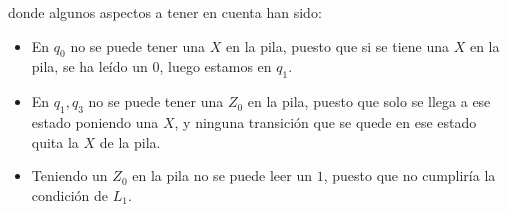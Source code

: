 \begin{ejercicio}
\begin{description}
\begin{comment}
            &\delta(q_0,2,Z_0) = \{(q_0,Z_0)\} \\
            &\delta(q_0,i,X) = \emptyset \qquad i\in\{0,1,2\}\\
            &\delta(q_1,0,X) = \{(q_1,XX)\} \\
            &\delta(q_1,1,X) = \{(q_2,\veps)\} \\
            &\delta(q_1,2,X) = \{(q_0,X)\} \\
            &\delta(q_1,i,Z_0) = \emptyset \qquad i\in\{0,1,2\}\\
            &\delta(q_2,0,X) = \{(q_3,XX)\} \\
            &\delta(q_2,1,X) = \{(q_0,\veps)\} \\
            &\delta(q_2,2,X) = \{(q_0,X)\} \\
            &\delta(q_2,0,Z_0) = \{(q_3,XZ_0)\} \\
            &\delta(q_2,1,Z_0) = \emptyset \\
            &\delta(q_2,2,Z_0) = \{(q_0,Z_0)\} \\
            &\delta(q_3,0,X) = \{(q_1, XX)\} \\
            &\delta(q_3,1,X) = \{(q_2,\veps)\} \\
            &\delta(q_3,2,X) = \{(q_4,X)\} \\
            &\delta(q_3,i,Z_0) = \emptyset \qquad i\in\{0,1,2\}\\
            &\delta(q_4,0,X) = \{(q_4,XX)\} \\
            &\delta(q_4,1,X) = \{(q_4,\veps)\} \\
            &\delta(q_4,2,X) = \{(q_4,X)\} \\
            &\delta(q_4,0,Z_0) = \{(q_4,XZ_0)\} \\
            &\delta(q_4,1,Z_0) = \emptyset \\
            &\delta(q_4,2,Z_0) = \{(q_4,Z_0)\} \\
            &\red{\delta(q_4,\veps,Z_0) = \{(q_4,\veps)\}}
        \end{align*}
        \end{comment}
        donde algunos aspectos a tener en cuenta han sido:
        \begin{itemize}
            \item En $q_0$ no se puede tener una $X$ en la pila, puesto que si se tiene una $X$ en la pila, se ha leído un $0$, luego estamos en $q_1$.
            \item En $q_1,q_3$ no se puede tener una $Z_0$ en la pila, puesto que solo se llega a ese estado poniendo una $X$, y ninguna transición que se quede en ese estado quita la $X$ de la pila.
            \item Teniendo un $Z_0$ en la pila no se puede leer un $1$, puesto que no cumpliría la condición de $L_1$.
        \end{itemize}


\end{description}
\end{ejercicio}
